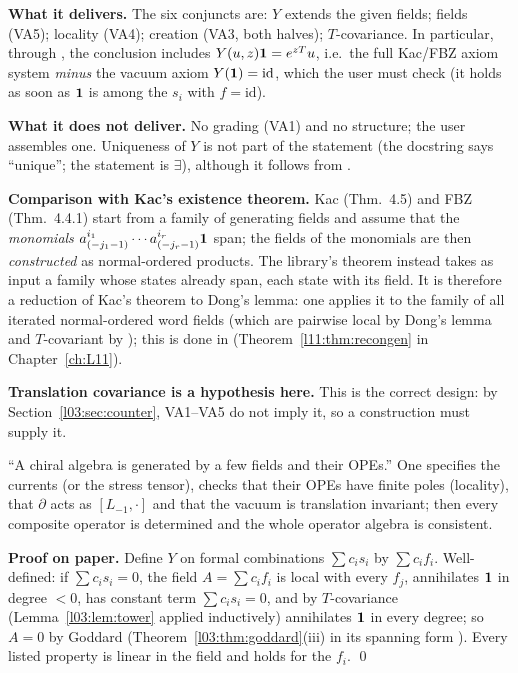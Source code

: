\begin{dictionary}
\textbf{What it delivers.} The six conjuncts are: $Y$ extends the given fields; fields (VA5); locality
(VA4); creation (VA3, both halves); $T$-covariance. In particular, through , the
conclusion includes $Y(u,z)\mathbf{1} = e^{zT}u$, i.e.\ the full Kac/FBZ axiom system \emph{minus} the
vacuum axiom $Y(\mathbf{1}) = \mathrm{id}$, which the user must check (it holds as soon as $\mathbf{1}$ is
among the $s_i$ with $f = \mathrm{id}$).

\textbf{What it does not deliver.} No grading (VA1) and no  structure; the user
assembles one. Uniqueness of $Y$ is not part of the statement (the docstring says ``unique''; the
statement is $\exists$), although it follows from .

\textbf{Comparison with Kac's existence theorem.} Kac (Thm.~4.5) and FBZ (Thm.~4.4.1) start from a
family of generating fields and assume that the \emph{monomials} $a^{i_1}_{(-j_1-1)}\cdots
a^{i_r}_{(-j_r-1)}\mathbf{1}$ span; the fields of the monomials are then \emph{constructed} as
normal-ordered products. The library's theorem instead takes as input a family whose states already
span, each state with its field. It is therefore a reduction of Kac's theorem to Dong's lemma: one
applies it to the family of all iterated normal-ordered word fields (which are pairwise local by
Dong's lemma and $T$-covariant by ); this is done in
 (Theorem~\ref{l11:thm:recongen} in Chapter~\ref{ch:L11}).

\textbf{Translation covariance is a hypothesis here.} This is the correct design: by
Section~\ref{l03:sec:counter}, VA1--VA5 do not imply it, so a construction must supply it.
\end{dictionary}

\begin{physics}
``A chiral algebra is generated by a few fields and their OPEs.'' One specifies the currents (or the
stress tensor), checks that their OPEs have finite poles (locality), that $\partial$ acts as $[L_{-1},\cdot]$
and that the vacuum is translation invariant; then every composite operator is determined and the
whole operator algebra is consistent.
\end{physics}

\textbf{Proof on paper.} Define $Y$ on formal combinations $\sum c_is_i$ by $\sum c_if_i$. Well-defined:
if $\sum c_is_i = 0$, the field $A = \sum c_if_i$ is local with every $f_j$, annihilates $\mathbf{1}$ in
degree $<0$, has constant term $\sum c_is_i = 0$, and by $T$-covariance (Lemma~\ref{l03:lem:tower}
applied inductively) annihilates $\mathbf{1}$ in every degree; so $A = 0$ by Goddard
(Theorem~\ref{l03:thm:goddard}(iii) in its spanning form ). Every listed
property is linear in the field and holds for the $f_i$. \qed

